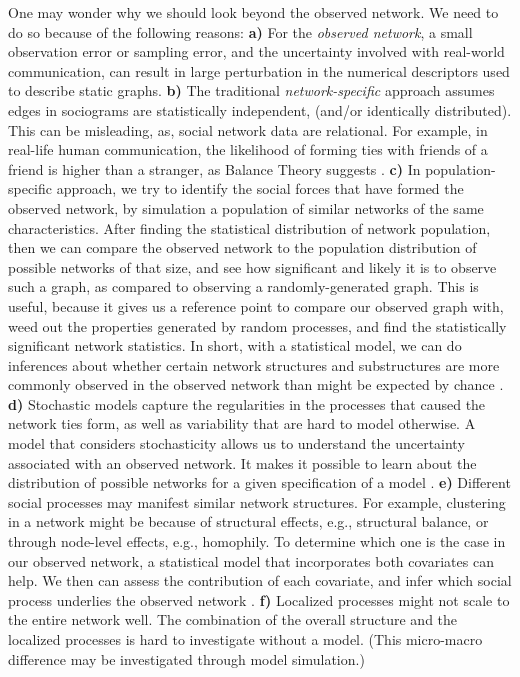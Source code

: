\documentclass{acm_proc_article-sp}
\begin{document}
One may wonder why we should look beyond the observed network. We need to do so because of the following reasons: \textbf{a)} For the \textit{observed network}, a small observation error or sampling error, and the uncertainty involved with real-world communication, can result in large perturbation in the numerical descriptors used to describe static graphs. \textbf{b)} The traditional \textit{network-specific} approach assumes edges in sociograms are statistically independent, (and/or identically distributed). This can be misleading, as, social network data are relational. For example, in real-life human communication, the likelihood of forming ties with friends of a friend is higher than a stranger, as Balance Theory suggests \cite{Heider}. \textbf{c)} In population-specific approach, we try to identify the social forces that have formed the observed network, by simulation a population of similar networks of the same characteristics. After finding the statistical distribution of network population, then we can compare the observed network to the population distribution of possible networks of that size, and see how significant and likely it is to observe such a graph, as compared to observing a randomly-generated graph. This is useful, because it gives us a reference point to compare our observed graph with, weed out the properties generated by random processes, and find the statistically significant network statistics. In short, with a statistical model, we can do inferences about whether certain network structures and substructures are more commonly observed in the observed network than might be expected by chance \cite{Robins}. \textbf{d)} Stochastic models capture the regularities in the processes that caused the network ties form, as well as variability that are hard to model otherwise. A model that considers stochasticity allows us to understand the uncertainty associated with an observed network. It makes it possible to learn about the distribution of possible networks for a given specification of a model \cite{Robins}. \textbf{e)} Different social processes may manifest similar network structures. For example, clustering in a network might be because of structural effects, e.g., structural balance, or through node-level effects, e.g., homophily. To determine which one is the case in our observed network, a statistical model that incorporates both covariates can help. We then can assess the contribution of each covariate, and infer which social process underlies the observed network \cite{Robins}. \textbf{f)} Localized processes might not scale to the entire network well. The combination of the overall structure and the localized processes is hard to investigate without a model. (This micro-macro difference may be investigated through model simulation.)\cite{Robins}
\end{document}
